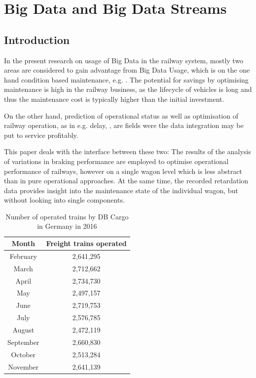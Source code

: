 \documentclass[a4paper, 12pt]{scrartcl}
\begin{document}
\section{Big Data and Big Data Streams}
\subsection{Introduction}
In the present research on usage of Big Data in the railway system, mostly two areas are considered to gain advantage from Big Data Usage, which is on the one hand condition based maintenance, e.g. \cite{fumeo2015condition, thaduri2015railway, elsen:Cray}. The potential for savings by optimising maintenance is high in the railway business, as the lifecycle of vehicles is long and thus the maintenance cost is typically higher than the initial investment.

On the other hand, prediction of operational status as well as optimisation of railway operation, as in e.g. \cite{papa2016delay, oneto2016} delay, \cite{elsen:ISC17}, are fields were the data integration may be put to service profitably.

This paper deals with the interface between these two: The results of the analysis of variations in braking performance are employed to optimise operational performance of railways, however on a single wagon level which is less abstract than in pure operational approaches. At the same time, the recorded retardation data  provides insight into the maintenance state of the individual wagon, but without looking into single components.

\begin{table}  
	\begin{center}  
	\caption{Number of operated trains by DB Cargo in Germany in 2016}
	\label{Tab:Zugfahrten}
	\begin{tabular}{|c|c|}
		\hline
		\textbf{Month}	& \textbf{Freight trains operated} \\ \hline
		February & 2,641,295 \\ \hline
		March & 2,712,662 \\ \hline
		April & 2,734,730 \\ \hline
		May & 2,497,157 \\ \hline
		June & 2,719,753 \\ \hline
		July & 2,576,785 \\ \hline
		August & 2,472,119 \\ \hline
		September & 2,660,830 \\ \hline
		October & 2,513,284 \\ \hline
		November & 2,641,139 \\ \hline 
	\end{tabular}
	\end{center}
\end{table}
\end{document}
